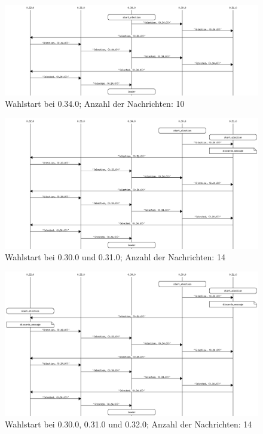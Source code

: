 \documentclass[a4paper,
12pt,
BCOR12mm,
]{scrartcl}
\theoremstyle{break}
\begin{document}
 \begin{figure}
   \begin{center}
     \includegraphics[scale=0.4]{../src/msc/single_election_at_0.34.0.png}
   \end{center}
   \caption{Wahlstart bei 0.34.0; Anzahl der Nachrichten: 10}
   \label{fig:s_34}
 \end{figure}

 \begin{figure}
   \begin{center}
     \includegraphics[scale=0.4]{../src/msc/concurrent_with_0.30.00.31.0.png}
   \end{center}
   \caption{Wahlstart bei 0.30.0 und 0.31.0; Anzahl der Nachrichten: 14}
   \label{fig:s_3031}
 \end{figure}

 \begin{figure}
   \begin{center}
     \includegraphics[scale=0.4]{../src/msc/concurrent_with_0.30.00.31.00.32.0.png}
   \end{center}
   \caption{Wahlstart bei 0.30.0, 0.31.0 und 0.32.0; Anzahl der Nachrichten: 14}
   \label{fig:s_303132}
 \end{figure}
\end{document}
